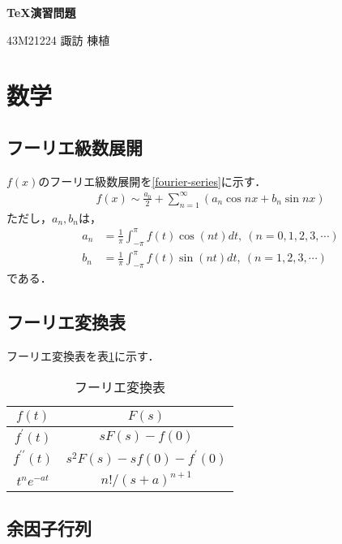 \documentclass[11pt,a4paper]{jsarticle}
\begin{document}
\begin{center}
  {\Large\bfseries \TeX 演習問題} %
\end{center}
\begin{flushright}
  {\large 43M21224 諏訪 棟植} %
\end{flushright}

\section{数学}

\subsection{フーリエ級数展開}

$f(x)$のフーリエ級数展開を\eqref{fourier-series}に示す．
\begin{align}\label{fourier-series}
  f(x)\sim\frac{a_0}{2}+\sum_{n=1}^\infty\left(a_n\cos nx+b_n\sin nx\right)
\end{align}
ただし，$a_n,b_n$は，
\begin{align*}
  a_n & =\frac{1}{\pi}\int_{-\pi}^\pi f(t)\cos(nt) dt,~(n=0,1,2,3,\cdots) \\
  b_n & =\frac{1}{\pi}\int_{-\pi}^\pi f(t)\sin(nt) dt,~(n=1,2,3,\cdots)
\end{align*}
である．

\subsection{フーリエ変換表}

フーリエ変換表を表\ref{tab:fourier-transform}に示す．
\begin{table}[htb]
  \centering
  \caption{フーリエ変換表}
  \label{tab:fourier-transform}
  \begin{tabular}{c|c}
    $f(t)$                & $F(s)$                      \\ \hline
    $f^\prime(t)$         & $sF(s)-f(0)$                \\
    $f^{\prime\prime}(t)$ & $s^2F(s)-sf(0)-f^\prime(0)$ \\
    $t^ne^{-at}$          & $n!/(s+a)^{n+1}$            \\
  \end{tabular}
\end{table}

\subsection{余因子行列}
\end{document}
